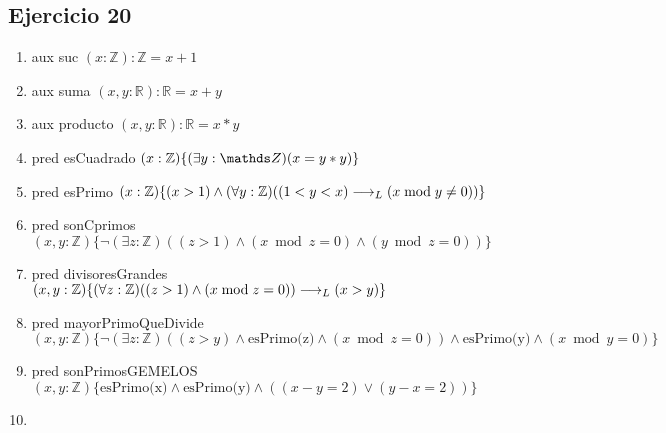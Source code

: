 \subsection{Ejercicio 20}
\begin{enumerate}
    \item aux suc $(x:\mathbb{Z}):\mathbb{Z} = x + 1$
    \item aux suma $(x, y:\mathbb{R}):\mathbb{R} = x + y$
    \item aux producto $(x, y:\mathbb{R}):\mathbb{R} = x*y$
    \item pred esCuadrado $(x: \mathbb{Z}) \{ (\exists y: \ent) (x = y*y)\}$
    \item pred esPrimo $(x:\mathbb{Z})\{(x > 1) \wedge (\forall y:\mathbb{Z}) ((1 < y < x) \longrightarrow _L (x \bmod y \neq 0))\}$
    \item pred sonCprimos $(x, y:\mathbb{Z}) \{\neg (\exists z: \mathbb{Z})((z > 1)\wedge(x \bmod z = 0) \wedge (y \bmod z = 0)) \}$
    \item pred divisoresGrandes $(x, y:\mathbb{Z}) \{(\forall z: \mathbb{Z}) ((z > 1)\wedge(x \bmod z = 0)) \longrightarrow _L (x > y) \}$
    \item pred mayorPrimoQueDivide $(x, y:\mathbb{Z}) \{\neg (\exists z:\mathbb{Z})((z > y) \wedge \text{esPrimo(z)} \wedge (x \bmod z = 0)) \wedge \text{esPrimo(y)} \wedge ( x\bmod y = 0) \}$
    \item pred sonPrimosGEMELOS $(x, y:\mathbb{Z}) \{ \text{esPrimo(x)} \wedge \text{esPrimo(y)} \wedge ((x-y=2) \vee (y-x=2)) \}$
    \item {}
\end{enumerate}


